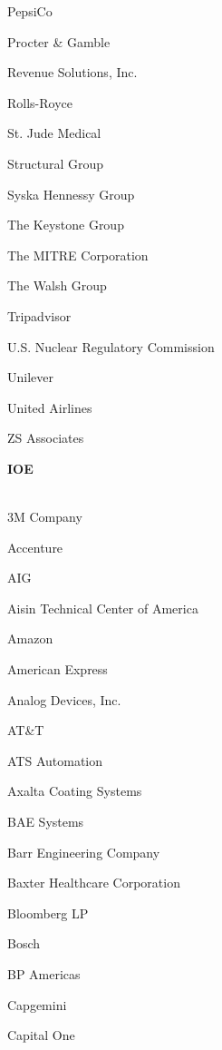 \documentclass[twoside]{article}
\begin{document}
\begin{center}
\begin{multicols}{5}
\begin{FlushLeft}
\begin{compactitem}
\item PepsiCo
\item Procter \& Gamble
\item Revenue Solutions, Inc.
\item Rolls-Royce
\item St. Jude Medical
\item Structural Group
\item Syska Hennessy Group
\item The Keystone Group
\item The MITRE Corporation
\item The Walsh Group
\item Tripadvisor
\item U.S. Nuclear Regulatory Commission
\item Unilever
\item United Airlines
\item ZS Associates
\end{compactitem}
        \end{FlushLeft}
        \vspace{1em}
        {\fontsize{14}{16}\selectfont \bf IOE}\\
        \vspace{-1em}
        ~\hrulefill~
        \vspace{-.9em}
        \begin{FlushLeft}
        \begin{compactitem}
        \item 3M Company
\item Accenture
\item AIG
\item Aisin Technical Center of America
\item Amazon
\item American Express
\item Analog Devices, Inc.
\item AT\&T
\item ATS Automation
\item Axalta Coating Systems
\item BAE Systems
\item Barr Engineering Company
\item Baxter Healthcare Corporation
\item Bloomberg LP
\item Bosch
\item BP Americas
\item Capgemini
\item Capital One

\end{compactitem}
\end{FlushLeft}
\end{multicols}
\end{center}
\end{document}
